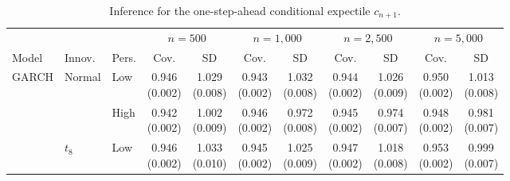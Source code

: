 \begin{table}[!t]
\centering
\caption{Inference for the one-step-ahead conditional expectile $c_{n+1}$.}
\label{tab:mc-ce}
\scriptsize
\setlength{\tabcolsep}{3.2pt}
\begin{tabular}{lllcccccccc}
\toprule
&&&\multicolumn{2}{c}{$n=500$}&\multicolumn{2}{c}{$n=1{,}000$}&\multicolumn{2}{c}{$n=2{,}500$}&\multicolumn{2}{c}{$n=5{,}000$}\\
\cmidrule(lr){4-5}\cmidrule(lr){6-7}\cmidrule(lr){8-9}\cmidrule(lr){10-11}
Model&Innov.&Pers.&Cov.&SD&Cov.&SD&Cov.&SD&Cov.&SD\\
\midrule
GARCH & Normal & Low & \shortstack{0.946\\[-1pt]\scriptsize(0.002)} & \shortstack{1.029\\[-1pt]\scriptsize(0.008)} & \shortstack{0.943\\[-1pt]\scriptsize(0.002)} & \shortstack{1.032\\[-1pt]\scriptsize(0.008)} & \shortstack{0.944\\[-1pt]\scriptsize(0.002)} & \shortstack{1.026\\[-1pt]\scriptsize(0.009)} & \shortstack{0.950\\[-1pt]\scriptsize(0.002)} & \shortstack{1.013\\[-1pt]\scriptsize(0.008)}\\
 &  & High & \shortstack{0.942\\[-1pt]\scriptsize(0.002)} & \shortstack{1.002\\[-1pt]\scriptsize(0.009)} & \shortstack{0.946\\[-1pt]\scriptsize(0.002)} & \shortstack{0.972\\[-1pt]\scriptsize(0.008)} & \shortstack{0.945\\[-1pt]\scriptsize(0.002)} & \shortstack{0.974\\[-1pt]\scriptsize(0.007)} & \shortstack{0.948\\[-1pt]\scriptsize(0.002)} & \shortstack{0.981\\[-1pt]\scriptsize(0.007)}\\
\addlinespace[1pt]
 & $t_8$ & Low & \shortstack{0.946\\[-1pt]\scriptsize(0.002)} & \shortstack{1.033\\[-1pt]\scriptsize(0.010)} & \shortstack{0.945\\[-1pt]\scriptsize(0.002)} & \shortstack{1.025\\[-1pt]\scriptsize(0.009)} & \shortstack{0.947\\[-1pt]\scriptsize(0.002)} & \shortstack{1.018\\[-1pt]\scriptsize(0.008)} & \shortstack{0.953\\[-1pt]\scriptsize(0.002)} & \shortstack{0.999\\[-1pt]\scriptsize(0.007)}\\

\end{tabular}
\end{table}
